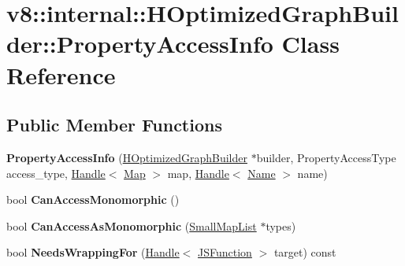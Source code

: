 \hypertarget{classv8_1_1internal_1_1_h_optimized_graph_builder_1_1_property_access_info}{}\section{v8\+:\+:internal\+:\+:H\+Optimized\+Graph\+Builder\+:\+:Property\+Access\+Info Class Reference}
\label{classv8_1_1internal_1_1_h_optimized_graph_builder_1_1_property_access_info}
\subsection*{Public Member Functions}
\begin{DoxyCompactItemize}
\item 
{\bfseries Property\+Access\+Info} (\hyperlink{classv8_1_1internal_1_1_h_optimized_graph_builder}{H\+Optimized\+Graph\+Builder} $\ast$builder, Property\+Access\+Type access\+\_\+type, \hyperlink{classv8_1_1internal_1_1_handle}{Handle}$<$ \hyperlink{classv8_1_1internal_1_1_map}{Map} $>$ map, \hyperlink{classv8_1_1internal_1_1_handle}{Handle}$<$ \hyperlink{classv8_1_1internal_1_1_name}{Name} $>$ name)\hypertarget{classv8_1_1internal_1_1_h_optimized_graph_builder_1_1_property_access_info_a99c4e447420baa8aec07279f7473b2be}{}\label{classv8_1_1internal_1_1_h_optimized_graph_builder_1_1_property_access_info_a99c4e447420baa8aec07279f7473b2be}

\item 
bool {\bfseries Can\+Access\+Monomorphic} ()\hypertarget{classv8_1_1internal_1_1_h_optimized_graph_builder_1_1_property_access_info_a901337c4522fb3fd35d19d67c3afcf3e}{}\label{classv8_1_1internal_1_1_h_optimized_graph_builder_1_1_property_access_info_a901337c4522fb3fd35d19d67c3afcf3e}

\item 
bool {\bfseries Can\+Access\+As\+Monomorphic} (\hyperlink{classv8_1_1internal_1_1_small_map_list}{Small\+Map\+List} $\ast$types)\hypertarget{classv8_1_1internal_1_1_h_optimized_graph_builder_1_1_property_access_info_a61a430c27d02a5caaeeb9e93b4a83f18}{}\label{classv8_1_1internal_1_1_h_optimized_graph_builder_1_1_property_access_info_a61a430c27d02a5caaeeb9e93b4a83f18}

\item 
bool {\bfseries Needs\+Wrapping\+For} (\hyperlink{classv8_1_1internal_1_1_handle}{Handle}$<$ \hyperlink{classv8_1_1internal_1_1_j_s_function}{J\+S\+Function} $>$ target) const \hypertarget{classv8_1_1internal_1_1_h_optimized_graph_builder_1_1_property_access_info_a0dffc17c3e166b732f1ee88bf51d8d97}{}\label{classv8_1_1internal_1_1_h_optimized_graph_builder_1_1_property_access_info_a0dffc17c3e166b732f1ee88bf51d8d97}


\end{DoxyCompactItemize}
